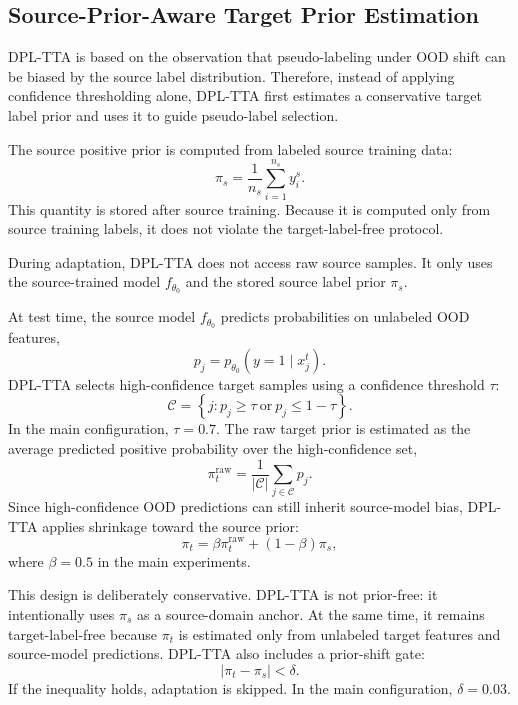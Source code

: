 \documentclass{article}
\begin{document}
\subsection{Source-Prior-Aware Target Prior Estimation}

DPL-TTA is based on the observation that pseudo-labeling under OOD shift can be biased by the source label distribution. Therefore, instead of applying confidence thresholding alone, DPL-TTA first estimates a conservative target label prior and uses it to guide pseudo-label selection.

The source positive prior is computed from labeled source training data:
\begin{equation}
\pi_s
=
\frac{1}{n_s}
\sum_{i=1}^{n_s} y_i^{s}.
\label{eq:source_prior}
\end{equation}
This quantity is stored after source training. Because it is computed only from source training labels, it does not violate the target-label-free protocol.

During adaptation, DPL-TTA does not access raw source samples. It only uses the source-trained model $f_{\theta_0}$ and the stored source label prior $\pi_s$.

At test time, the source model $f_{\theta_0}$ predicts probabilities on unlabeled OOD features,
\begin{equation}
p_j
=
p_{\theta_0}(y=1 \mid x_j^{t}).
\label{eq:target_probability}
\end{equation}
DPL-TTA selects high-confidence target samples using a confidence threshold $\tau$:
\begin{equation}
\mathcal{C}
=
\left\{
j :
p_j \geq \tau
\ \mathrm{or}\ 
p_j \leq 1-\tau
\right\}.
\label{eq:confident_set}
\end{equation}
In the main configuration, $\tau=0.7$. The raw target prior is estimated as the average predicted positive probability over the high-confidence set,
\begin{equation}
\pi_t^{\mathrm{raw}}
=
\frac{1}{|\mathcal{C}|}
\sum_{j \in \mathcal{C}} p_j .
\label{eq:raw_target_prior}
\end{equation}
Since high-confidence OOD predictions can still inherit source-model bias, DPL-TTA applies shrinkage toward the source prior:
\begin{equation}
\pi_t
=
\beta \pi_t^{\mathrm{raw}}
+
(1-\beta)\pi_s,
\label{eq:shrunk_target_prior}
\end{equation}
where $\beta=0.5$ in the main experiments.

This design is deliberately conservative. DPL-TTA is not prior-free: it intentionally uses $\pi_s$ as a source-domain anchor. At the same time, it remains target-label-free because $\pi_t$ is estimated only from unlabeled target features and source-model predictions. DPL-TTA also includes a prior-shift gate:
\begin{equation}
\left|\pi_t - \pi_s\right| < \delta .
\label{eq:prior_shift_gate}
\end{equation}
If the inequality holds, adaptation is skipped. In the main configuration, $\delta=0.03$.
\end{document}
